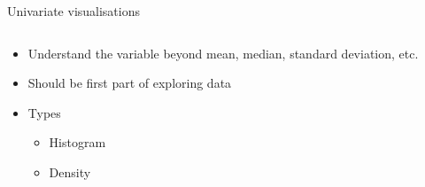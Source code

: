 \documentclass{beamer}
\begin{document}
\begin{frame}{Univariate visualisations}
    \begin{columns}
        \begin{column}{0.4\textwidth}
            \begin{itemize}[<+->]
                \item Understand the variable beyond mean, median, standard deviation, etc.
                \item Should be first part of exploring data
                \item Types
                \begin{itemize}
                    \item Histogram
                    \item Density
                \end{itemize}
            \end{itemize}
        \end{column}
        \begin{column}{0.6\textwidth}
        \end{column}
    \end{columns}
\end{frame}
\end{document}
